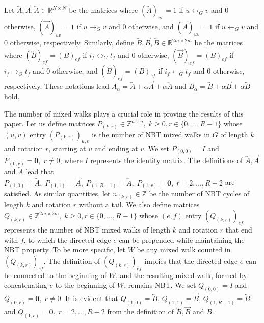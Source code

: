 \documentclass{article}
\theoremstyle{plain}
\begin{document}
Let $\overleftrightarrow{A}, \overrightarrow{A}, \overleftarrow{A} \in \mathbb{R}^{N\times N}$ be
the matrices where $( \overleftrightarrow{A} )_{uv} = 1$ if $u\leftrightarrow_{G} v$ and $0$ otherwise,
$( \overrightarrow{A} )_{uv} = 1$ if $u\rightarrow_{G} v$ and $0$ otherwise, and
$( \overleftarrow{A} )_{uv} = 1$ if $u\leftarrow_{G} v$ and $0$ otherwise, respectively.
Similarly, define $\overleftrightarrow{B}, \overrightarrow{B}, \overleftarrow{B} \in \mathbb{R}^{2m \times 2m}$ be the matrices where $( \overleftrightarrow{B} )_{ef} = (B)_{ef}$ if $i_f \leftrightarrow_{G} t_f$ and $0$ otherwise,
$( \overrightarrow{B} )_{ef} = (B)_{ef}$ if $i_f \rightarrow_{G} t_f$ and $0$ otherwise,
and $( \overleftarrow{B} )_{ef} = (B)_{ef}$ if $i_f \leftarrow_{G} t_f$ and $0$ otherwise, respectively.
These notations lead $A_{\alpha} = \overleftrightarrow{A} + \alpha \overrightarrow{A} + \bar{\alpha} \overleftarrow{A}$
and $B_{\alpha} = \overleftrightarrow{B} + \alpha \overrightarrow{B} + \bar{\alpha} \overleftarrow{B}$ hold.

The number of mixed walks plays a crucial role in proving the results of this paper.
Let us define matrices $P_{(k,r)} \in \mathbb{Z}^{n\times n},\; k\geq 0, r\in \{ 0,\dots,R-1 \}$ whose $(u,v)$ entry $( P_{(k,r)} )_{u,v}$ is the number of NBT mixed walks in $G$ of length $k$ and rotation $r$, starting at $u$ and ending at $v$.
We set $P_{(0,0)} = I$ and $P_{(0,r)} = \bm{0},\; r\neq 0$, where $I$ represents the identity matrix.
The definitions of $\overleftrightarrow{A}, \overrightarrow{A}$ and $\overleftarrow{A}$ lead that $P_{(1,0)} = \overleftrightarrow{A},\; P_{(1,1)} = \overrightarrow{A},\; P_{(1,R-1)} = \overleftarrow{A},\; P_{(1,r)} = \bm{0},\; r=2,\dots, R-2$ are satisfied.
As similar quantities, let $n_{(k,r)} \in \mathbb{Z}$ be the number of NBT cycles of length $k$ and rotation $r$ without a tail.
We also define matrices $Q_{(k,r)} \in \mathbb{Z}^{2m\times 2m},\; k\geq 0, r\in \{ 0,\dots,R-1 \}$ whose $(e,f)$ entry $( Q_{(k,r)} )_{ef}$ represents the number of NBT mixed walks of length $k$ and rotation $r$ that end with $f$, to which the directed edge $e$ can be prepended while maintaining the NBT property.
To be more specific, let $W$ be any mixed walk counted in $( Q_{(k,r)} )_{ef}$.
The definition of $(Q_{(k,r)} )_{ef}$ implies that the directed edge $e$ can be connected to the beginning of $W$,
and the resulting mixed walk, formed by concatenating $e$ to the beginning of $W$, remains NBT.
We set $Q_{(0,0)} = I$ and $Q_{(0,r)} = \bm{0},\; r\neq 0$.
It is evident that $Q_{(1,0)} = \overleftrightarrow{B}$, $Q_{(1,1)} = \overrightarrow{B}$,
$Q_{(1,R-1)} = \overleftarrow{B}$ and $Q_{(1,r)} = \bm{0},\; r=2,\dots, R-2$ from the definition of $\overleftrightarrow{B}, \overrightarrow{B}$ and $\overleftarrow{B}$.
\end{document}
